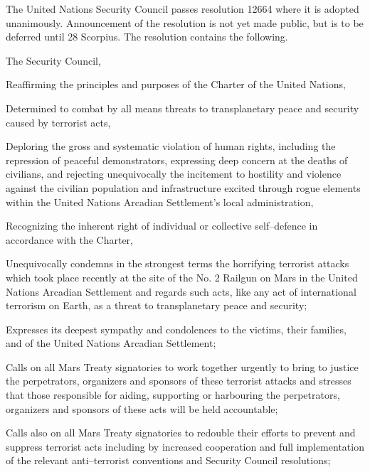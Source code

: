 

The United Nations Security Council passes resolution 12664 where it is adopted unanimously. Announcement of the resolution is not yet made public, but is to be deferred until 28 Scorpius. The resolution contains the following.

\startTimelineGeneralDocument
The Security Council,

Reaffirming the principles and purposes of the Charter of the United Nations,

Determined to combat by all means threats to transplanetary peace and security caused by terrorist acts,

Deploring the gross and systematic violation of human rights, including the repression of peaceful demonstrators, expressing deep concern at the deaths of civilians, and rejecting unequivocally the incitement to hostility and violence against the civilian population and infrastructure excited through rogue elements within the United Nations Arcadian Settlement's local administration,

Recognizing the inherent right of individual or collective self--defence in accordance with the Charter,

\startitemize[R]
\item Unequivocally condemns in the strongest terms the horrifying terrorist attacks which took place recently at the site of the No. \type{#}2 Railgun on Mars in the United Nations Arcadian Settlement and regards such acts, like any act of international terrorism on Earth, as a threat to transplanetary peace and security;

\item Expresses its deepest sympathy and condolences to the victims, their families, and of the United Nations Arcadian Settlement;

\item Calls on all Mars Treaty signatories to work together urgently to bring to justice the perpetrators, organizers and sponsors of these terrorist attacks and stresses that those responsible for aiding, supporting or harbouring the perpetrators, organizers and sponsors of these acts will be held accountable;

\item Calls also on all Mars Treaty signatories to redouble their efforts to prevent and suppress terrorist acts including by increased cooperation and full implementation of the relevant anti--terrorist conventions and Security Council resolutions;

